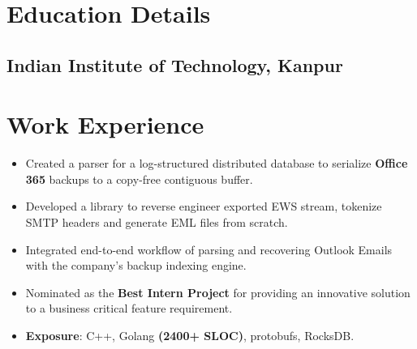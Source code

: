 \documentclass[10pt, margin=0.5in]{deedy-resume-openfont}
\begin{document}
\begin{minipage}[t]{0.48\textwidth}


\vspace{-8pt}
\section{Education Details}
\subsection{Indian Institute of Technology, Kanpur}

\section{Work Experience}
\begin{itemize}[leftmargin=*, noitemsep]
  \item Created a parser for a log-structured distributed database to serialize
  \textbf{Office 365} backups to a copy-free contiguous buffer.
  \item Developed a library to reverse engineer exported EWS stream, tokenize SMTP
	headers and generate EML files from scratch.
  \item Integrated end-to-end workflow of parsing and recovering Outlook Emails
	with the company's backup indexing engine.
  \item Nominated as the \textbf{Best Intern Project} for providing an innovative
	solution to a business critical feature requirement.
  \item \textbf{Exposure}: C++, Golang \textbf{(2400+ SLOC)}, protobufs, RocksDB.
\end{itemize}


\end{minipage}
\end{document}
